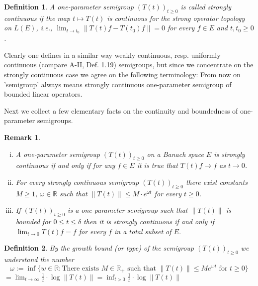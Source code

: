 \documentclass{article}
\newtheorem{definition}{Definition}
\newtheorem{remark}{Remark}
\begin{document}
\begin{definition}
A one-parameter semigroup $(T(t))_{t \geq 0}$ is called strongly continuous if the map $t \mapsto T(t)$ is continuous for the strong operator topology on $L(E)$, i.e., $\lim_{t \to t_0} \|T(t)f - T(t_0)f\| = 0$ for every $f \in E$ and $t, t_0 \geq 0$.
\end{definition}

Clearly one defines in a similar way weakly continuous, resp. uniformly continuous (compare A-II, Def. 1.19) semigroups, but since we concentrate on the strongly continuous case we agree on the following terminology:
From now on 'semigroup' always means strongly continuous one-parameter semigroup of bounded linear operators.

Next we collect a few elementary facts on the continuity and boundedness of one-parameter semigroups.

\begin{remark}

\begin{enumerate}[(i)]
\item
A one-parameter semigroup $(T(t))_{t \geq 0}$ on a Banach space $E$ is strongly continuous if and only if for any $f \in E$ it is true that $T(t)f \to f$ as $t \to 0$.

\item
For every strongly continuous semigroup $(T(t))_{t \geq 0}$ there exist constants $M \geq 1$, $\omega \in \mathbb{R}$ such that $\|T(t)\| \leq M \cdot e^{\omega t}$ for every $t \geq 0$.

\item
If $(T(t))_{t \geq 0}$ is a one-parameter semigroup such that $\|T(t)\|$ is bounded for $0 \leq t \leq \delta$ then it is strongly continuous if and only if $\lim_{t \to 0} T(t)f = f$ for every $f$ in a total subset of $E$.

\end{enumerate}

\end{remark}

\begin{definition}
By the growth bound (or type) of the semigroup $(T(t))_{t \geq 0}$ we understand the number
\begin{equation}
\omega := \inf\{w \in \mathbb{R}: \text{There exists } M \in \mathbb{R}_{+} \text{ such that } \|T(t)\| \leq M e^{wt} \text{ for } t \geq 0\}
\end{equation}
$= \lim_{t \to \infty} \frac{1}{t} \cdot \log\|T(t)\| = \inf_{t > 0} \frac{1}{t} \cdot \log\|T(t)\|$
\end{definition}
\end{document}
